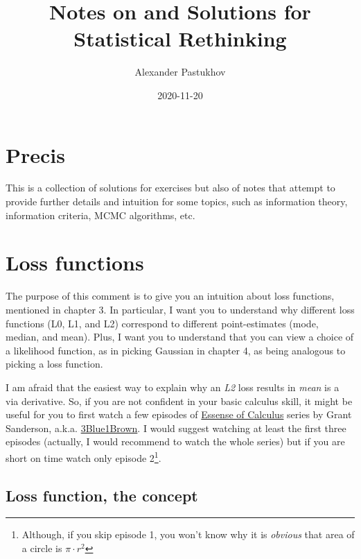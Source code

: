 \documentclass[
]{book}
\title{Notes on and Solutions for Statistical Rethinking}
\author{Alexander Pastukhov}
\date{2020-11-20}
\begin{document}
\maketitle

{
\setcounter{tocdepth}{1}
\tableofcontents
}
\hypertarget{precis}{%
\chapter{Precis}\label{precis}}

This is a collection of solutions for exercises but also of notes that attempt to provide further details and intuition for some topics, such as information theory, information criteria, MCMC algorithms, etc.

\hypertarget{loss-functions}{%
\chapter{Loss functions}\label{loss-functions}}

The purpose of this comment is to give you an intuition about loss functions, mentioned in chapter 3. In particular, I want you to understand why different loss functions (L0, L1, and L2) correspond to different point-estimates (mode, median, and mean). Plus, I want you to understand that you can view a choice of a likelihood function, as in picking Gaussian in chapter 4, as being analogous to picking a loss function.

I am afraid that the easiest way to explain why an \emph{L2} loss results in \emph{mean} is a via derivative. So, if you are not confident in your basic calculus skill, it might be useful for you to first watch a few episodes of \href{https://www.youtube.com/playlist?list=PLZHQObOWTQDMsr9K-rj53DwVRMYO3t5Yr}{Essense of Calculus} series by Grant Sanderson, a.k.a. \href{https://www.3blue1brown.com/}{3Blue1Brown}. I would suggest watching at least the first three episodes (actually, I would recommend to watch the whole series) but if you are short on time watch only episode 2\footnote{Although, if you skip episode 1, you won't know why it is \emph{obvious} that area of a circle is \(\pi\cdot r^2\)}.

\hypertarget{loss-function-the-concept}{%
\section{Loss function, the concept}\label{loss-function-the-concept}}
\end{document}
